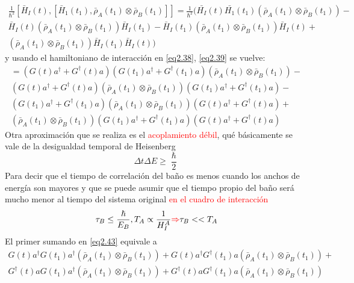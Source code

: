 \documentclass{book}
\begin{document}
\begin{equation}\label{eq2.42}\begin{aligned}\frac{1}{\hslash^2}[\bar{H}_I(t),[\bar{H}_1(t_1),\bar{\rho}_A(t_1)\otimes\bar{\rho}_B(t_1)]]=\frac{1}{\hslash^2}(\bar{H_I}(t)\bar{H_1}(t_1)(\bar{\rho}_A(t_1)\otimes\bar{\rho}_B(t_1))-\\  \bar{H}_I(t)(\bar{\rho}_A(t_1)\otimes\bar{\rho}_B(t_1))\bar{H}_I(t_1) -\bar{H}_I(t_1)(\bar{\rho}_A(t_1)\otimes\bar{\rho}_B(t_1))\bar{H}_I(t)+ \\ (\bar{\rho}_A(t_1)\otimes\bar{\rho}_B(t_1))\bar{H}_I(t_1)\bar{H}_I(t))\end{aligned}\end{equation}
 y usando el hamiltoniano de interacción en \textcolor{blue}{\ref{eq2.38}}, \textcolor{blue}{\ref{eq2.39}} se vuelve:
 \begin{equation}\begin{aligned} \label{eq2.43} { =(G(t)a^\dag+G^\dag(t)a)(G(t_1)a^\dag+G^\dag(t_1)a)(\bar{\rho}_A(t_1)\otimes\bar{\rho}_B(t_1))-} \\ {(G(t)a^\dag+G^\dag(t)a)(\bar{\rho}_A(t_1)\otimes\bar{\rho}_B(t_1))(G(t_1)a^\dag+G^\dag(t_1)a)-} \\ {(G(t_1)a^\dag+G^\dag(t_1)a)(\bar{\rho}_A(t_1)\otimes\bar{\rho}_B(t_1))(G(t)a^\dag+G^\dag(t)a)+} \\ {(\bar{\rho}_A(t_1)\otimes\bar{\rho}_B(t_1))(G(t_1)a^\dag+G^\dag(t_1)a)(G(t)a^\dag+G^\dag(t)a)} \end{aligned}\end{equation}
 Otra aproximación que se realiza es el \textcolor{red}{acoplamiento débil}, qué básicamente se vale de la desigualdad temporal de Heisenberg
 \begin{equation}\label{eq2.44} {\Delta t \Delta E \geq \frac{\hslash}{2}}\end{equation}
 Para decir que el tiempo de correlación del baño es menos cuando los anchos de energía son mayores y que se puede asumir que el tiempo propio del baño será mucho menor al tiempo del sistema original \textcolor{red}{en el cuadro de interacción}
 \begin{equation}\label{eq2.45} {\tau_B \leq \frac{\hslash}{E_B}, T_A\propto \frac{1}{H^A_I}\textcolor{red}{\Rightarrow} \tau_B << T_A}\end{equation}
 El primer sumando en \textcolor{blue}{\ref{eq2.43}} equivale a
 \begin{equation}\begin{aligned}\label{eq2.46} {G(t)a^\dag G(t_1)a^\dag(\bar{\rho}_A(t_1)\otimes\bar{\rho}_B(t_1))+ G(t)a^\dag G^\dag(t_1)a(\bar{\rho}_A(t_1)\otimes\bar{\rho}_B(t_1))+} \\ {G^\dag(t)a G(t_1)a^\dag(\bar{\rho}_A(t_1)\otimes\bar{\rho}_B(t_1))+ G^\dag(t)a G^\dag(t_1) a(\bar{\rho}_A(t_1)\otimes\bar{\rho}_B(t_1))}\end{aligned}\end{equation}
\end{document}
